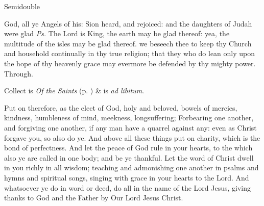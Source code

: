 \label{EpiphanyV}
\begin{inhead}
{Semidouble}
\end{inhead}
\par\noindent
{}



\properantiphonfix

\introit
{} God, all ye Angels of his: Sion heard, and rejoiced: and the daughters of Judah were glad \textit{Ps.} The Lord is King, the earth may be glad thereof: yea, the multitude of the isles may be glad thereof.
\collect\label{EpiphanyVCollect}
 we beseech thee to keep thy Church and household continually in thy true religion; that they who do lean only upon the hope of thy heavenly grace may evermore be defended by thy mighty power. Through.
\begin{rubric}
     Collect is \emph{Of the Saints} (p. \pageref{SPSaints}) \&  is \emph{ad libitum}.
\end{rubric}
 Put on therefore, as the elect of God, holy and beloved, bowels of mercies, kindness, humbleness of mind, meekness, longsuffering; Forbearing one another, and forgiving one another, if any man have a quarrel against any: even as Christ forgave you, so also do ye. And above all these things put on charity, which is the bond of perfectness. And let the peace of God rule in your hearts, to the which also ye are called in one body; and be ye thankful. Let the word of Christ dwell in you richly in all wisdom; teaching and admonishing one another in psalms and hymns and spiritual songs, singing with grace in your hearts to the Lord. And whatsoever ye do in word or deed, do all in the name of the Lord Jesus, giving thanks to God and the Father by Our Lord Jesus Christ.


